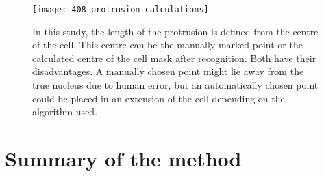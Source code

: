 \begin{figure}[h!]
 \centering
 \texttt{[image: 408\_protrusion\_calculations]}
 \caption[Protrusion calulation]{
 	In this study, the length of the protrusion is defined from the centre of the cell. This centre can be the manually marked point or the calculated centre of the cell mask after recognition. Both have their disadvantages. A manually chosen point might lie away from the true nucleus due to human error, but an automatically chosen point could be placed in an extension of the cell depending on the algorithm used.
 }
 \label{fig:protrusioncalc}
\end{figure}

\section{Summary of the method}

